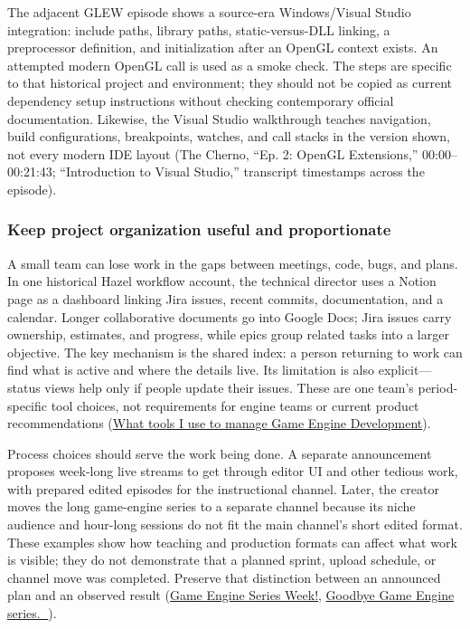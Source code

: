 The adjacent GLEW episode shows a source-era Windows/Visual Studio integration: include paths, library paths, static-versus-DLL linking, a preprocessor definition, and initialization after an OpenGL context exists. An attempted modern OpenGL call is used as a smoke check. The steps are specific to that historical project and environment; they should not be copied as current dependency setup instructions without checking contemporary official documentation. Likewise, the Visual Studio walkthrough teaches navigation, build configurations, breakpoints, watches, and call stacks in the version shown, not every modern IDE layout (The Cherno, ``Ep. 2: OpenGL Extensions,'' 00:00--00:21:43; ``Introduction to Visual Studio,'' transcript timestamps across the episode).

\subsubsection{Keep project organization useful and proportionate}\label{05-engine-i-ch013-keep-project-organization-useful-and-proportionate}

\hypertarget{05-engine-i-ch013-keep-project-organization-useful-and-proportionate}{}

A small team can lose work in the gaps between meetings, code, bugs, and plans. In one historical Hazel workflow account, the technical director uses a Notion page as a dashboard linking Jira issues, recent commits, documentation, and a calendar. Longer collaborative documents go into Google Docs; Jira issues carry ownership, estimates, and progress, while epics group related tasks into a larger objective. The key mechanism is the shared index: a person returning to work can find what is active and where the details live. Its limitation is also explicit---status views help only if people update their issues. These are one team's period-specific tool choices, not requirements for engine teams or current product recommendations (\href{https://www.youtube.com/watch?v=XGYEk9rbGjU&t=3m11s}{What tools I use to manage Game Engine Development}).

Process choices should serve the work being done. A separate announcement proposes week-long live streams to get through editor UI and other tedious work, with prepared edited episodes for the instructional channel. Later, the creator moves the long game-engine series to a separate channel because its niche audience and hour-long sessions do not fit the main channel's short edited format. These examples show how teaching and production formats can affect what work is visible; they do not demonstrate that a planned sprint, upload schedule, or channel move was completed. Preserve that distinction between an announced plan and an observed result (\href{https://www.youtube.com/watch?v=Q4wHOx5av0w&t=0m1s}{Game Engine Series Week!}, \href{https://www.youtube.com/watch?v=4w9NYltdaew&t=0m3s}{Goodbye Game Engine series. 👋}).

